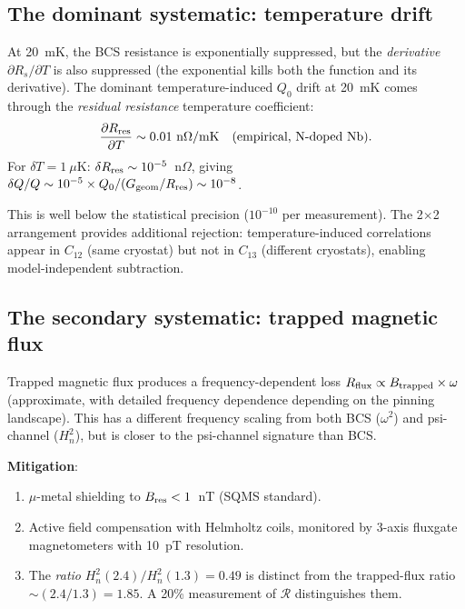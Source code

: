 \documentclass[11pt]{article}
\newcommand{\Heff}{H_n}
\begin{document}
\subsection{The dominant systematic: temperature drift}

At 20~mK, the BCS resistance is exponentially suppressed, but the
\textit{derivative} $\partial R_s/\partial T$ is also suppressed
(the exponential kills both the function and its derivative). The
dominant temperature-induced $Q_0$ drift at 20~mK comes through the
\textit{residual resistance} temperature coefficient:
\begin{equation}
\frac{\partial R_{\rm res}}{\partial T} \sim 0.01~\text{n}\Omega/\text{mK}
\quad\text{(empirical, N-doped Nb)}.
\end{equation}
For $\delta T = 1~\mu$K: $\delta R_{\rm res} \sim 10^{-5}$~n$\Omega$,
giving $\delta Q/Q \sim 10^{-5}\times Q_0/(G_{\rm geom}/R_{\rm res})
\sim 10^{-8}$.

This is well below the statistical precision ($10^{-10}$ per
measurement). The 2$\times$2 arrangement provides additional rejection:
temperature-induced correlations appear in $C_{12}$ (same cryostat) but
not in $C_{13}$ (different cryostats), enabling model-independent
subtraction.

\subsection{The secondary systematic: trapped magnetic flux}

Trapped magnetic flux produces a frequency-dependent loss
$R_{\rm flux} \propto B_{\rm trapped}\times\omega$ (approximate, with
detailed frequency dependence depending on the pinning landscape).
This has a different frequency scaling from both BCS ($\omega^2$) and
psi-channel ($\Heff^2$), but is closer to the psi-channel signature
than BCS.

\textbf{Mitigation}:
\begin{enumerate}[nosep]
\item $\mu$-metal shielding to $B_{\rm res} < 1$~nT (SQMS standard).
\item Active field compensation with Helmholtz coils, monitored by
  3-axis fluxgate magnetometers with 10~pT resolution.
\item The \textit{ratio} $\Heff^2(2.4)/\Heff^2(1.3) = 0.49$ is
  distinct from the trapped-flux ratio $\sim (2.4/1.3) = 1.85$.
  A 20\% measurement of $\mathcal{R}$ distinguishes them.
\end{enumerate}
\end{document}
